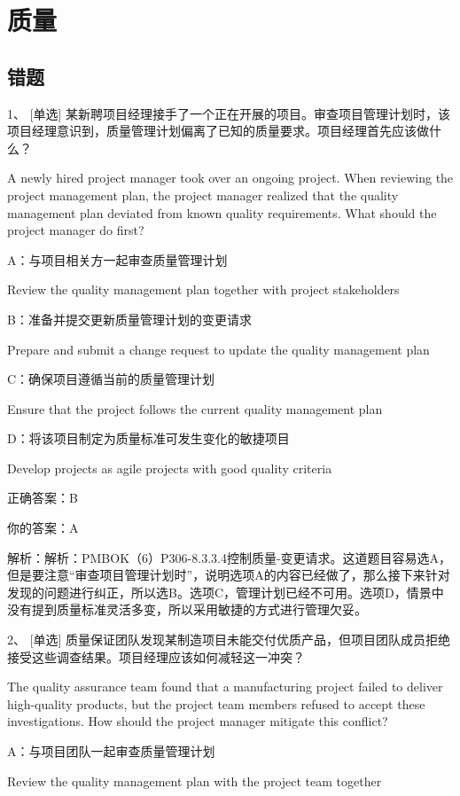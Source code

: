 
\chapter{质量}

\section{错题}

1、 [单选] 某新聘项目经理接手了一个正在开展的项目。审查项目管理计划时，该项目经理意识到，质量管理计划偏离了已知的质量要求。项目经理首先应该做什么？

A newly hired project manager took over an ongoing project. When reviewing the project management plan, the project manager realized that the quality management plan deviated from known quality requirements. What should the project manager do first?

A：与项目相关方一起审查质量管理计划

Review the quality management plan together with project stakeholders

B：准备并提交更新质量管理计划的变更请求

Prepare and submit a change request to update the quality management plan

C：确保项目遵循当前的质量管理计划

Ensure that the project follows the current quality management plan

D：将该项目制定为质量标准可发生变化的敏捷项目

Develop projects as agile projects with good quality criteria

正确答案：B

你的答案：A

解析：解析：PMBOK（6）P306-8.3.3.4控制质量-变更请求。这道题目容易选A，但是要注意“审查项目管理计划时”，说明选项A的内容已经做了，那么接下来针对发现的问题进行纠正，所以选B。选项C，管理计划已经不可用。选项D，情景中没有提到质量标准灵活多变，所以采用敏捷的方式进行管理欠妥。


2、 [单选] 质量保证团队发现某制造项目未能交付优质产品，但项目团队成员拒绝接受这些调查结果。项目经理应该如何减轻这一冲突？

The quality assurance team found that a manufacturing project failed to deliver high-quality products, but the project team members refused to accept these investigations. How should the project manager mitigate this conflict?

A：与项目团队一起审查质量管理计划

Review the quality management plan with the project team together

